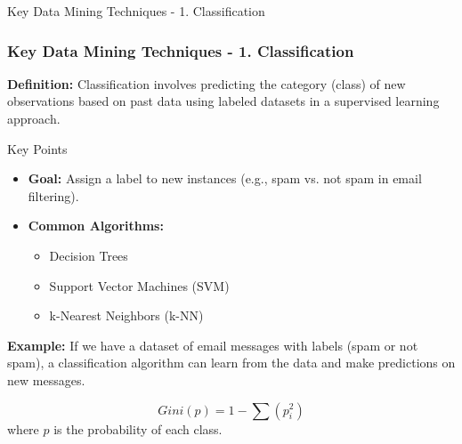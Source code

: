 \documentclass[aspectratio=169]{beamer}
\begin{document}
\begin{frame}[fragile]{Key Data Mining Techniques - 1. Classification}
    \frametitle{Key Data Mining Techniques - 1. Classification}
    
    \textbf{Definition:} Classification involves predicting the category (class) of new observations based on past data using labeled datasets in a supervised learning approach.

    \begin{block}{Key Points}
        \begin{itemize}
            \item \textbf{Goal:} Assign a label to new instances (e.g., spam vs. not spam in email filtering).
            \item \textbf{Common Algorithms:}
                \begin{itemize}
                    \item Decision Trees
                    \item Support Vector Machines (SVM)
                    \item k-Nearest Neighbors (k-NN)
                \end{itemize}
        \end{itemize}
    \end{block}
    
    \textbf{Example:} 
    If we have a dataset of email messages with labels (spam or not spam), a classification algorithm can learn from the data and make predictions on new messages.
    
    \begin{equation}
        Gini(p) = 1 - \sum (p_i^2)
    \end{equation}
    where \(p\) is the probability of each class.
\end{frame}
\end{document}
